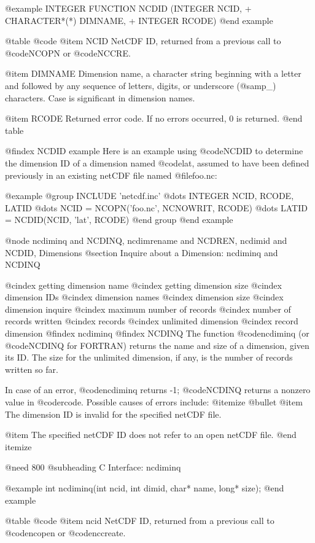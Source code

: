 @example
      INTEGER FUNCTION NCDID (INTEGER NCID,
     +                        CHARACTER*(*) DIMNAME,
     +                        INTEGER RCODE)
@end example

@table @code
@item NCID
NetCDF ID, returned from a previous call to @code{NCOPN} or @code{NCCRE}.

@item DIMNAME
Dimension name, a character string beginning with a letter and followed
by any sequence of letters, digits, or underscore (@samp{_}) characters.
Case is significant in dimension names.

@item RCODE
Returned error code.  If no errors occurred, 0 is returned.
@end table

@findex NCDID example
Here is an example using @code{NCDID} to determine the dimension ID of
a dimension named @code{lat}, assumed to have been defined previously in
an existing netCDF file named @file{foo.nc}:

@example
@group
      INCLUDE 'netcdf.inc'
         @dots{}
      INTEGER NCID, RCODE, LATID
         @dots{}
      NCID = NCOPN('foo.nc', NCNOWRIT, RCODE)
         @dots{}
      LATID = NCDID(NCID, 'lat', RCODE)
@end group
@end example

@node ncdiminq and NCDINQ, ncdimrename and NCDREN, ncdimid and NCDID, Dimensions
@section Inquire about a Dimension:  ncdiminq and NCDINQ

@cindex getting dimension name
@cindex getting dimension size
@cindex dimension IDs
@cindex dimension names
@cindex dimension size
@cindex dimension inquire
@cindex maximum number of records
@cindex number of records written
@cindex records
@cindex unlimited dimension
@cindex record dimension
@findex ncdiminq
@findex NCDINQ
The function @code{ncdiminq} (or @code{NCDINQ} for FORTRAN) returns the
name and size of a dimension, given its ID.  The size for the unlimited
dimension, if any, is the number of records written so far.

In case of an error, @code{ncdiminq} returns -1; @code{NCDINQ} returns a
nonzero value in @code{rcode}.  Possible causes of errors include:
@itemize @bullet
@item
The dimension ID is invalid for the specified netCDF file.

@item
The specified netCDF ID does not refer to an open netCDF file.
@end itemize

@need 800
@subheading C Interface:  ncdiminq

@example
int ncdiminq(int ncid, int dimid, char* name, long* size);
@end example

@table @code
@item ncid
NetCDF ID, returned from a previous call to @code{ncopen} or @code{nccreate}.

